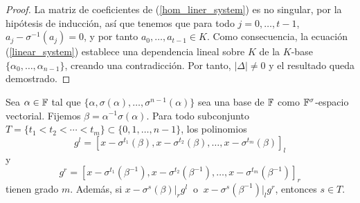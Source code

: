 \begin{proof}
La matriz de coeficientes de (\ref{hom_liner_system}) es no singular, por la hipótesis de inducción, así que tenemos que para todo \(j = 0, \dots, t-1\), \(a_j - \sigma^{-1}(a_j) = 0\), y por tanto \(a_0, \dots, a_{t-1} \in K\). Como consecuencia, la ecuación (\ref{linear_system}) establece una dependencia lineal sobre  \(K\) de la  \(K\)-base  \(\{\alpha_0, \dots, \alpha_{n-1}\}\), creando una contradicción. Por tanto, \(|\Delta| \neq 0\) y el resultado queda demostrado.
\end{proof}

\begin{lemma}
\label{lem:deg_lcm}
    Sea \(\alpha \in \mathbb{F}\) tal que \(\{\alpha, \sigma(\alpha), \dots, \sigma^{n-1}(\alpha)\}\) sea una base de \(\mathbb{F}\) como  \(\mathbb{F}^\sigma\)-espacio vectorial. Fijemos  \(\beta = \alpha^{-1}\sigma(\alpha)\). Para todo subconjunto \(T = \{t_1 < t_2 < \cdots < t_m\} \subset \{0, 1, \dots, n-1\}\), los polinomios
    \[
    g^l = [x - \sigma^{t_1}(\beta), x - \sigma^{t_2}(\beta), \dots, x - \sigma^{t_m}(\beta)]_l
    \]
y
    \[
    g^r = [x - \sigma^{t_1}(\beta^{-1}), x - \sigma^{t_2}(\beta^{-1}), \dots, x - \sigma^{t_m}(\beta^{-1})]_r
    \]
tienen grado \(m\). Además, si \(x - \sigma^s(\beta) |_r g^l\ \) o \(\ x - \sigma^s(\beta^{-1}) |_l g^r\), entonces \(s \in T\).
\end{lemma}

